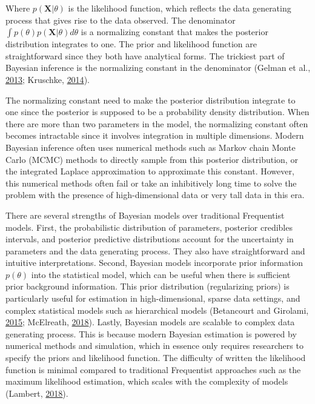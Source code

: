 \documentclass[12pt]{book}
\numberwithin{equation}{chapter}
\begin{document}
Where \(p(\mathbf{X}|\theta)\) is the likelihood function, which reflects the data generating process that gives rise to the data observed. The denominator \(\int p(\theta)p(\mathbf{X}|\theta)d\theta\) is a normalizing constant that makes the posterior distribution integrates to one. The prior and likelihood function are straightforward since they both have analytical forms. The trickiest part of Bayesian inference is the normalizing constant in the denominator (Gelman et al., \protect\hyperlink{ref-gelman2013bayesian}{2013}; Kruschke, \protect\hyperlink{ref-kruschke2014doing}{2014}).

The normalizing constant need to make the posterior distribution integrate to one since the posterior is supposed to be a probability density distribution. When there are more than two parameters in the model, the normalizing constant often becomes intractable since it involves integration in multiple dimensions. Modern Bayesian inference often uses numerical methods such as Markov chain Monte Carlo (MCMC) methods to directly sample from this posterior distribution, or the integrated Laplace approximation to approximate this constant. However, this numerical methods often fail or take an inhibitively long time to solve the problem with the presence of high-dimensional data or very tall data in this era.

There are several strengths of Bayesian models over traditional Frequentist models. First, the probabilistic distribution of parameters, posterior credibles intervals, and posterior predictive distributions account for the uncertainty in parameters and the data generating process. They also have straightforward and intuitive interpretations. Second, Bayesian models incorporate prior information \(p(\theta)\) into the statistical model, which can be useful when there is sufficient prior background information. This prior distribution (regularizing priors) is particularly useful for estimation in high-dimensional, sparse data settings, and complex statistical models such as hierarchical models (Betancourt and Girolami, \protect\hyperlink{ref-betancourt2015hamiltonian}{2015}; McElreath, \protect\hyperlink{ref-mcelreath2018statistical}{2018}). Lastly, Bayesian models are scalable to complex data generating process. This is because modern Bayesian estimation is powered by numerical methods and simulation, which in essence only requires researchers to specify the priors and likelihood function. The difficulty of written the likelihood function is minimal compared to traditional Frequentist approaches such as the maximum likelihood estimation, which scales with the complexity of models (Lambert, \protect\hyperlink{ref-lambert2018student}{2018}).
\end{document}
